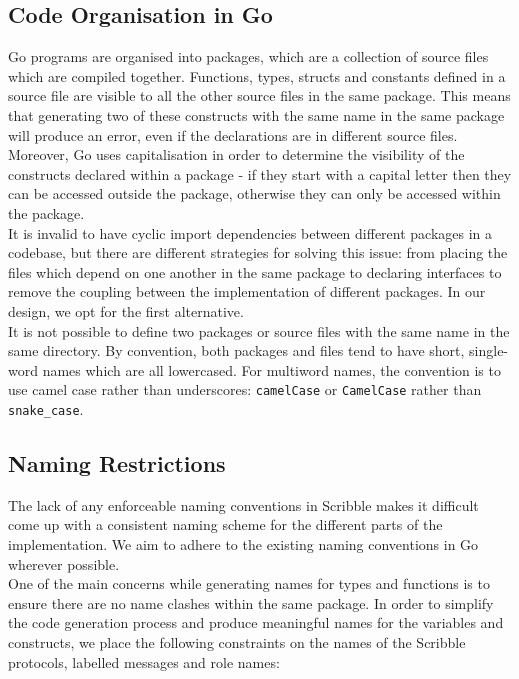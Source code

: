 \documentclass[12pt,twoside]{report}
\begin{document}
\subsection{Code Organisation in Go}

Go programs are organised into packages, which are a collection of source files which are compiled together. Functions, types, structs and constants defined in a source file are visible to all the other source files in the same package\cite{godocs}. This means that generating two of these constructs with the same name in the same package will produce an error, even if the declarations are in different source files. Moreover, Go uses capitalisation in order to determine the visibility of the constructs declared within a package - if they start with a capital letter then they can be accessed outside the package, otherwise they can only be accessed within the package.\\

It is invalid to have cyclic import dependencies between different packages in a codebase, but there are different strategies for solving this issue: from placing the files which depend on one another in the same package to declaring interfaces to remove the coupling between the implementation of different packages. In our design, we opt for the first alternative.\\

It is not possible to define two packages or source files with the same name in the same directory. By convention, both packages and files tend to have short, single-word names which are all lowercased. For multiword names, the convention is to use camel case rather than underscores: \texttt{camelCase} or \texttt{CamelCase} rather than \texttt{snake\_case}.\\

\subsection{Naming Restrictions}\label{naming-restrictions}

The lack of any enforceable naming conventions in Scribble makes it difficult come up with a consistent naming scheme for the different parts of the implementation. We aim to adhere to the existing naming conventions in Go wherever possible.\\

One of the main concerns while generating names for types and functions is to ensure there are no name clashes within the same package. In order to simplify the code generation process and produce meaningful names for the variables and constructs, we place the following constraints on the names of the Scribble protocols, labelled messages and role names:
\end{document}
